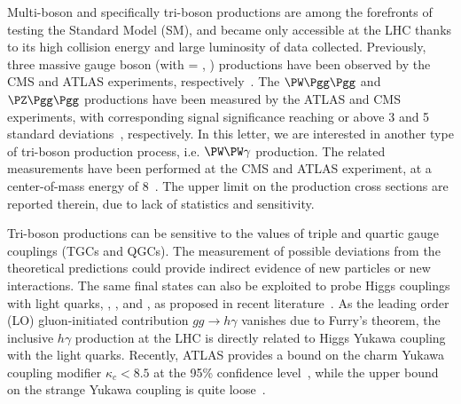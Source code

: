 
\maketitle 

Multi-boson and specifically tri-boson productions are among the forefronts of testing the Standard Model (SM), and became only accessible at the LHC thanks to its high collision energy and large luminosity of data collected. Previously, three massive gauge boson (\PV\PV\PV with \PV = \PW, \PZ) productions have been observed by the CMS and ATLAS experiments, respectively~\cite{CMS:2020hjs,ATLAS:2021atz}. 
The $\PW\Pgg\Pgg$ and $\PZ\Pgg\Pgg$ productions have been measured by the ATLAS and CMS experiments, with corresponding signal significance reaching or above 3 and 5 standard deviations~\cite{ATLAS:2015ify,ATLAS:2016qjc,CMS:2017tzy,CMS:2021jji}, respectively. In this letter, we are interested in another type of tri-boson production process, i.e. $\PW\PW\gamma$ production. The related measurements have been performed at the CMS and ATLAS experiment, at a center-of-mass energy of 8\TeV~\cite{CMS:2014cdf,ATLAS:2017bon}. The upper limit on the production cross sections are reported therein, due to lack of statistics and sensitivity.

Tri-boson productions can be sensitive to the values of triple and quartic gauge couplings (TGCs and QGCs). The measurement of possible deviations from the theoretical predictions could provide indirect evidence of new particles or new interactions. The same final states can also be exploited to probe Higgs couplings with light quarks, \PQc, \PQs, \PQu and \PQd, as proposed in recent literature~\cite{Khanpour:2017inb,Aguilar-Saavedra:2020rgo,Falkowski:2020znk}. As the leading order (LO) gluon-initiated contribution $gg\rightarrow h\gamma$ vanishes due to Furry’s theorem, the inclusive $h\gamma$ production at the LHC is directly related to Higgs Yukawa coupling with the light quarks. Recently, ATLAS provides a bound on the charm Yukawa coupling modifier $\kappa_c<8.5$ at the 95\% confidence level~\cite{ATLAS:2021zwx}, while the upper bound on the strange Yukawa coupling is quite loose~\cite{Duarte-Campderros:2018ouv,ATLAS:2018xfc}.

